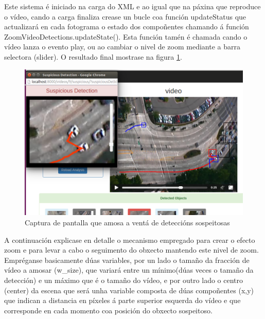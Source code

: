         Este sistema é iniciado na carga do XML e ao igual que na páxina que reproduce o vídeo, cando a 
        carga finaliza crease
        un bucle coa función updateStatus que actualizará en cada fotograma o estado dos compoñentes 
        chamando á función ZoomVideoDetections.updateState(). Esta función tamén é chamada cando o vídeo
        lanza o evento play, ou ao cambiar o nivel de zoom mediante a barra selectora (slider).
        O resultado final mostrase na figura \ref{fig:suspiciousPopupCapture}.

        \begin{figure}[htp]
        \begin{center}
            \includegraphics[scale=0.4]{figures/suspiciousPopupCapture.png}
            \caption{Captura de pantalla que amosa a ventá de deteccións sospeitosas}
        \label{fig:suspiciousPopupCapture}
        \end{center}
        \end{figure} 
        
        A continuación explicase en detalle o mecanismo empregado para crear o efecto zoom e para 
        levar a cabo o seguimento do obxecto mantendo este nivel de zoom. Empréganse 
        basicamente dúas variables, por un lado o tamaño da fracción de vídeo a amosar (w\_size), que
        variará entre un mínimo(dúas veces o tamaño da detección) e un máximo que é o tamaño do vídeo, 
        e por outro lado o centro (center) da escena que será unha variable composta de dúas 
        compoñentes (x,y) que indican a distancia en píxeles á parte superior esquerda do vídeo e 
        que corresponde en cada momento coa posición do obxecto sospeitoso.
        

